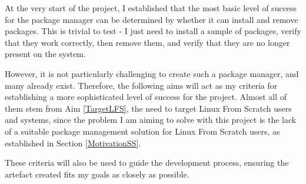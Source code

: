 \documentclass[10pt]{article}
\begin{document}
At the very start of the project, I established that the most basic level of success for the package manager can be determined by whether it can install and remove packages. This is trivial to test - I just need to install a sample of packages, verify that they work correctly, then remove them, and verify that they are no longer present on the system.

However, it is not particularly challenging to create such a package manager, and many already exist. Therefore, the following aims will act as my criteria for establishing a more sophisticated level of success for the project. Almost all of them stem from Aim \ref{TargetLFS}, the need to target Linux From Scratch users and systems, since the problem I am aiming to solve with this project is the lack of a suitable package management solution for Linux From Scratch users, as established in Section \ref{MotivationSS}.

These criteria will also be used to guide the development process, ensuring the artefact created fits my goals as closely as possible.
\end{document}
